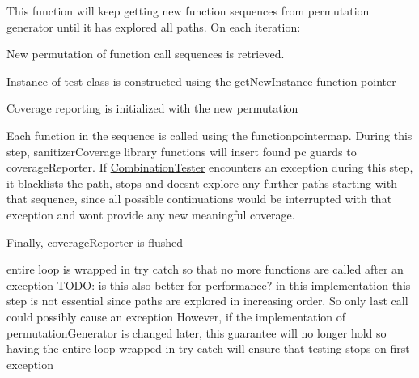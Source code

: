 This function will keep getting new function sequences from permutation generator until it has explored all paths. On each iteration\+:
\begin{DoxyEnumerate}
\item New permutation of function call sequences is retrieved.
\item Instance of test class is constructed using the get\+New\+Instance function pointer
\item Coverage reporting is initialized with the new permutation
\item Each function in the sequence is called using the functionpointermap. During this step, sanitizer\+Coverage library functions will insert found pc guards to coverage\+Reporter. If \hyperlink{classCombinationTester}{Combination\+Tester} encounters an exception during this step, it blacklists the path, stops and doesn\textquotesingle{}t explore any further paths starting with that sequence, since all possible continuations would be interrupted with that exception and won\textquotesingle{}t provide any new meaningful coverage.
\item Finally, coverage\+Reporter is flushed 
\end{DoxyEnumerate}entire loop is wrapped in try catch so that no more functions are called after an exception T\+O\+DO\+: is this also better for performance? in this implementation this step is not essential since paths are explored in increasing order. So only last call could possibly cause an exception However, if the implementation of permutation\+Generator is changed later, this guarantee will no longer hold so having the entire loop wrapped in try catch will ensure that testing stops on first exception